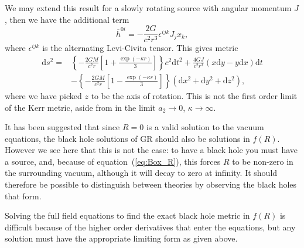 \documentclass[a4paper, 11pt, titlepage, twoside]{report}
\newcommand{\eqnref}[1]{equation~(\ref{eq:#1})}
\newcommand{\dd}{\ensuremath{\mathrm{d}}}
\begin{document}
We may extend this result for a slowly rotating source with angular momentum $J$, then we have the additional term\cite{Hobson2006}
\begin{equation}
\overline{h}^{0i} = -\frac{2G}{c^2r^3} \epsilon^{ijk}J_j x_k,
\end{equation}
where $\epsilon^{ijk}$ is the alternating Levi-Civita tensor. This gives metric
\begin{align}
\dd s^2 = {} & \left\{-\frac{2GM}{c^2r}\left[1 + \frac{\exp(- \kappa r)}{3}\right]\right\}c^2\dd t^2 + \frac{4GJ}{c^2r^3}\left(x\dd y - y\dd x\right)\dd t \nonumber \\ & - {} \left\{-\frac{2GM}{c^2r}\left[1 - \frac{\exp(- \kappa r)}{3}\right]\right\}\left(\dd x^2 + \dd y^2 + \dd z^2\right),
\end{align}
where we have picked $z$ to be the axis of rotation. This is not the first order limit of the Kerr metric, aside from in the limit $a_2 \rightarrow 0$, $\kappa \rightarrow \infty$.

It has been suggested that since $R = 0$ is a valid solution to the vacuum equations, the black hole solutions of GR should also be solutions in $f(R)$\cite{Psaltis2008, Barausse2008}. However we see here that this is not the case: to have a black hole you must have a source, and, because of \eqnref{Box_R}, this forces $R$ to be non-zero in the surrounding vacuum, although it will decay to zero at infinity\cite{Olmo2007c}. It should therefore be possible to distinguish between theories by observing the black holes that form.

Solving the full field equations to find the exact black hole metric in $f(R)$ is difficult because of the higher order derivatives that enter the equations, but any solution must have the appropriate limiting form as given above.
\end{document}

